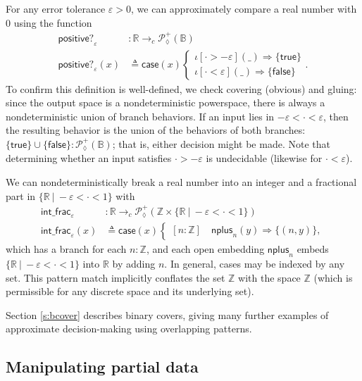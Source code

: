 \documentclass[conference]{IEEEtran}
\newcommand{\PLower}{\mathcal{P}_\lozenge}
\newcommand{\cto}{\to_c}
\newcommand{\R}{\mathbb{R}}
\newcommand{\Z}{\mathbb{Z}}
\newcommand{\suchthat}{\ |\ }
\newcommand{\bool}{\mathbb{B}}
\newcommand{\wildcard}{\_}
\newcommand{\oinclf}[1]{\iota[{#1}]}
\newcommand{\oincl}[2]{\oinclf{#1} \left({#2}\right)}
\newcommand{\Branch}{\Rightarrow}
\begin{document}
For any error tolerance $\varepsilon > 0$, we can approximately compare a real number with 0 using the function
\begin{align*}
\mathsf{positive?}_\varepsilon &: \R \cto \PLower^+(\bool)
\\ \mathsf{positive?}_\varepsilon(x) &\triangleq \mathsf{case}(x)
\begin{cases}
\oincl{\cdot > - \varepsilon}{\wildcard} \Branch \{ \mathsf{true} \}
\\ \oincl{\cdot < \varepsilon}{\wildcard} \Branch \{ \mathsf{false} \}
\end{cases}.
\end{align*}
To confirm this definition is well-defined, we check covering (obvious) and gluing: since the output space is a nondeterministic powerspace, there is always a nondeterministic union of branch behaviors. If an input lies in $- \varepsilon < \cdot < \varepsilon$, then the resulting behavior is the union of the behaviors of both branches: $\{ \mathsf{true} \} \cup \{ \mathsf{false} \} : \PLower^+(\bool)$; that is, either decision might be made. Note that determining whether an input satisfies $\cdot > - \varepsilon$ is undecidable (likewise for $\cdot < \varepsilon$).

We can nondeterministically break a real number into an integer and a fractional part in $\{ \R \suchthat -\varepsilon < \cdot < 1 \}$ with
\begin{align*}
\mathsf{int\_frac}_\varepsilon &: \R \cto \PLower^+(\Z \times \{ \R \suchthat -\varepsilon < \cdot < 1 \})
\\ \mathsf{int\_frac}_\varepsilon(x) &\triangleq \mathsf{case}(x)
\begin{cases}
[n : \Z] \quad \mathsf{nplus}_n(y) \Branch \{ (n, y) \},
\end{cases}
\end{align*}
which has a branch for each $n : \Z$, and each open embedding $\mathsf{nplus}_n$ embeds $\{ \R \suchthat -\varepsilon < \cdot < 1 \}$ into $\R$ by adding $n$. In general, cases may be indexed by any set. This pattern match implicitly conflates the set $\Z$ with the space $\Z$ (which is permissible for any discrete space and its underlying set).

Section \ref{s:bcover} describes binary covers, giving many further examples of approximate decision-making using overlapping patterns.

\subsection{Manipulating partial data}
\label{s:ex:partial}
\end{document}
